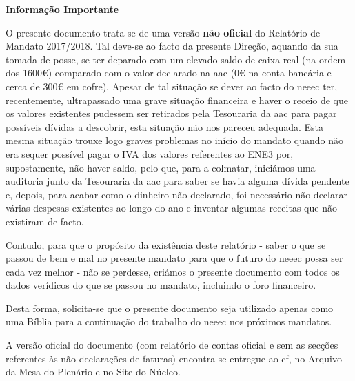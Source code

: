 
\vspace*{1.5cm}
\centerline{
\textbf{\LARGE{Informação Importante}}}

\vspace{1.2 cm}
O presente documento trata-se de uma versão \textbf{não oficial} do Relatório de Mandato 2017/2018. Tal deve-se ao facto da presente Direção, aquando da sua tomada de posse, se ter deparado com um elevado saldo de caixa real (na ordem dos 1600€) comparado com o valor declarado na \acrshort{aac} (0€ na conta bancária e cerca de 300€ em cofre). Apesar de tal situação se dever ao facto do \acrshort{neeec} ter, recentemente, ultrapassado uma grave situação financeira e haver o receio de que os valores existentes pudessem ser retirados pela Tesouraria da \acrshort{aac} para pagar possíveis dívidas a descobrir, esta situação não nos pareceu adequada. Esta mesma situação trouxe logo graves problemas no início do mandato quando não era sequer possível pagar o IVA dos valores referentes ao ENE3 por, supostamente, não haver saldo, pelo que, para a colmatar, iniciámos uma auditoria junto da Tesouraria da \acrshort{aac} para saber se havia alguma dívida pendente e, depois, para acabar como o dinheiro não declarado, foi necessário não declarar várias despesas existentes ao longo do ano e inventar algumas receitas que não existiram de facto.

Contudo, para que o propósito da existência deste relatório - saber o que se passou de bem e mal no presente mandato para que o futuro do \acrshort{neeec} possa ser cada vez melhor - não se perdesse, criámos o presente documento com todos os dados verídicos do que se passou no mandato, incluindo o foro financeiro.

Desta forma, solicita-se que o presente documento seja utilizado apenas como uma Bíblia para a continuação do trabalho do \acrshort{neeec} nos próximos mandatos.

A versão oficial do documento (com relatório de contas oficial e sem as secções referentes às não declarações de faturas) encontra-se entregue ao \acrfull{cf}, no Arquivo da Mesa do Plenário e no Site do Núcleo.
